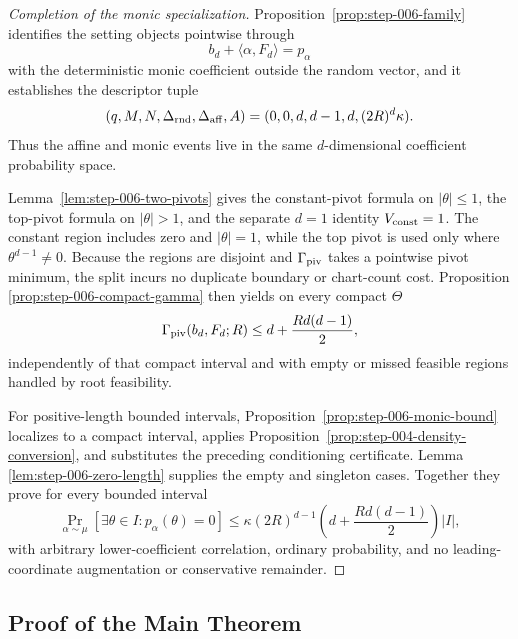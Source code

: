 \begin{proof}[Completion of the monic specialization]
Proposition~\ref{prop:step-006-family} identifies the setting objects
pointwise through
\[
b_d+\langle\alpha,F_d\rangle=p_\alpha
\]
with the deterministic monic coefficient outside the random vector, and it
establishes the descriptor tuple
\[
(q,M,N,\Delta_{\rm rnd},\Delta_{\rm aff},A)
=(0,0,d,d-1,d,(2R)^d\kappa).
\]
Thus the affine and monic events live in the same $d$-dimensional coefficient
probability space.

Lemma~\ref{lem:step-006-two-pivots} gives the constant-pivot formula on
$|\theta|\leq1$, the top-pivot formula on $|\theta|>1$, and the separate
$d=1$ identity $V_{\rm const}=1$.  The constant region includes zero and
$|\theta|=1$, while the top pivot is used only where
$\theta^{d-1}\neq0$.  Because the regions are disjoint and
$\Gamma_{\rm piv}$ takes a pointwise pivot minimum, the split incurs no
duplicate boundary or chart-count cost.  Proposition
\ref{prop:step-006-compact-gamma} then yields on every compact $\Theta$
\[
\Gamma_{\rm piv}(b_d,F_d;R)
\leq d+\frac{Rd(d-1)}2,
\]
independently of that compact interval and with empty or missed feasible
regions handled by root feasibility.

For positive-length bounded intervals,
Proposition~\ref{prop:step-006-monic-bound} localizes to a compact interval,
applies Proposition~\ref{prop:step-004-density-conversion}, and substitutes
the preceding conditioning certificate.  Lemma
\ref{lem:step-006-zero-length} supplies the empty and singleton cases.
Together they prove for every bounded interval
\[
\Pr_{\alpha\sim\mu}
[\exists\theta\in I:p_\alpha(\theta)=0]
\leq
\kappa(2R)^{d-1}
\left(d+\frac{Rd(d-1)}2\right)|I|,
\]
with arbitrary lower-coefficient correlation, ordinary probability, and no
leading-coordinate augmentation or conservative remainder.
\end{proof}

\subsection{Proof of the Main Theorem}
\label{app:main-proof}


